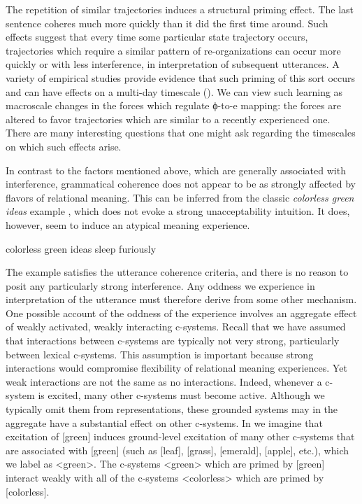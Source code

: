   The repetition of similar trajectories induces a structural priming effect. The last sentence coheres much more quickly than it did the first time around. Such effects suggest that every time some particular state trajectory occurs, trajectories which require a similar pattern of re-organizations can occur more quickly or with less interference, in interpretation of subsequent utterances. A variety of empirical studies provide evidence that such priming of this sort occurs and can have effects on a multi-day timescale (\citealt{BockEtAl2007,VSFerreiraEtAl2006,Nagata1988,Nagata1992,PickeringFerreira2008,RowlandEtAl2012}). We can view such learning as macroscale changes in the forces which regulate ϕ-to-e mapping: the forces are altered to favor trajectories which are similar to a recently experienced one. There are many interesting questions that one might ask regarding the timescales on which such effects arise.

In contrast to the factors mentioned above, which are generally associated with interference, grammatical coherence does not appear to be as strongly affected by flavors of relational meaning. This can be inferred from the classic \textit{colorless green ideas} example \citep{Chomsky1956}, which does not evoke a strong unacceptability intuition. It does, however, seem to induce an atypical meaning experience.
 
\ea
colorless green ideas sleep furiously
\z 

  The example satisfies the utterance coherence criteria, and there is no reason to posit any particularly strong interference. Any oddness we experience in interpretation of the utterance must therefore derive from some other mechanism. One possible account of the oddness of the experience involves an aggregate effect of weakly activated, weakly interacting c-systems. Recall that we have assumed that interactions between c-systems are typically not very strong, particularly between lexical c-systems. This assumption is important because strong interactions would compromise flexibility of relational meaning experiences. Yet weak interactions are not the same as no interactions. Indeed, whenever a c-system is excited, many other c-systems must become active. Although we typically omit them from representations, these grounded systems may in the aggregate have a substantial effect on other c-systems. In {} we imagine that excitation of [green] induces ground-level excitation of many other c-systems that are associated with [green] (such as [leaf], [grass], [emerald], [apple], etc.), which we label as <green>. The c-systems <green> which are primed by [green] interact weakly with all of the c-systems <colorless> which are primed by [colorless]. 

